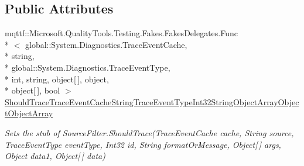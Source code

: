 \subsection*{Public Attributes}
\begin{DoxyCompactItemize}
\item 
mqttf\-::\-Microsoft.\-Quality\-Tools.\-Testing.\-Fakes.\-Fakes\-Delegates.\-Func\\*
$<$ global\-::\-System.\-Diagnostics.\-Trace\-Event\-Cache, \\*
string, \\*
global\-::\-System.\-Diagnostics.\-Trace\-Event\-Type, \\*
int, string, object\mbox{[}$\,$\mbox{]}, object, \\*
object\mbox{[}$\,$\mbox{]}, bool $>$ \hyperlink{class_system_1_1_diagnostics_1_1_fakes_1_1_stub_source_filter_ad6cf832013d35306d1e418c8d876460d}{Should\-Trace\-Trace\-Event\-Cache\-String\-Trace\-Event\-Type\-Int32\-String\-Object\-Array\-Object\-Object\-Array}
\begin{DoxyCompactList}\small\item\em Sets the stub of Source\-Filter.\-Should\-Trace(\-Trace\-Event\-Cache cache, String source, Trace\-Event\-Type event\-Type, Int32 id, String format\-Or\-Message, Object\mbox{[}$\,$\mbox{]} args, Object data1, Object\mbox{[}$\,$\mbox{]} data)\end{DoxyCompactList}\end{DoxyCompactItemize}
